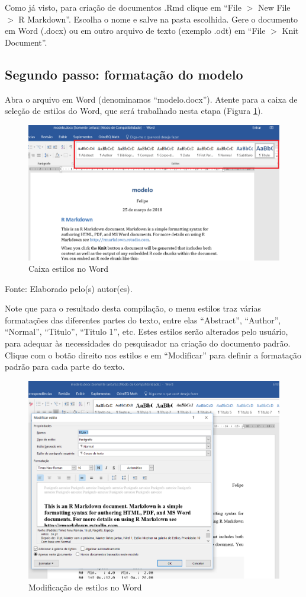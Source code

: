 \documentclass[12pt,brazil,oneside]{book}
\begin{document}
Como já visto, para criação de documentos .Rmd clique em ``File \(>\)
New File \(>\) R Markdown''. Escolha o nome e salve na pasta escolhida.
Gere o documento em Word (.docx) ou em outro arquivo de texto (exemplo
.odt) em ``File \(>\) Knit Document''.

\hypertarget{segundo-passo-formatacao-do-modelo}{%
\subsection{Segundo passo: formatação do
modelo}\label{segundo-passo-formatacao-do-modelo}}

Abra o arquivo em Word (denominamos ``modelo.docx''). Atente para a
caixa de seleção de estilos do Word, que será trabalhado nesta etapa
(Figura \ref{fig:rmarkestilos}).

\begin{figure}[H]

{\centering \includegraphics[width=0.6\linewidth]{rmarkestilos} 

}

\caption{Caixa estilos no Word}\label{fig:rmarkestilos}
\end{figure}

Fonte: Elaborado pelo(s) autor(es).

Note que para o resultado desta compilação, o menu estilos traz várias
formatações das diferentes partes do texto, entre elas ``Abstract'',
``Author'', ``Normal'', ``Titulo'', ``Titulo 1'', etc. Estes estilos
serão alterados pelo usuário, para adequar às necessidades do
pesquisador na criação do documento padrão. Clique com o botão direito
nos estilos e em ``Modificar'' para definir a formatação padrão para
cada parte do texto.

\begin{figure}[H]

{\centering \includegraphics[width=0.6\linewidth]{rmarkestilos1} 

}

\caption{Modificação de estilos no Word}\label{fig:rmarkestilos1}
\end{figure}
\end{document}
